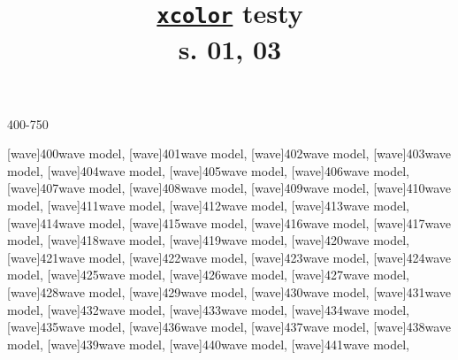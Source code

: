 \documentclass[a4paper,11pt]{article}
\title{\href{https://repo.skni.umcs.pl/ctan/macros/latex/contrib/xcolor/xcolor.pdf}{\texttt{xcolor}} testy \\
  s. 01, 03}
\author{}
\begin{document}





\maketitle %



400-750

\noindent
{}[wave]{400}{wave model},
[wave]{401}{wave model},
[wave]{402}{wave model},
[wave]{403}{wave model},
[wave]{404}{wave model},
[wave]{405}{wave model},
[wave]{406}{wave model}, \\
[wave]{407}{wave model},
[wave]{408}{wave model},
[wave]{409}{wave model},
[wave]{410}{wave model},
[wave]{411}{wave model},
[wave]{412}{wave model},
[wave]{413}{wave model}, \\
[wave]{414}{wave model},
[wave]{415}{wave model},
[wave]{416}{wave model},
[wave]{417}{wave model},
[wave]{418}{wave model},
[wave]{419}{wave model},
[wave]{420}{wave model}, \\
[wave]{421}{wave model},
[wave]{422}{wave model},
[wave]{423}{wave model},
[wave]{424}{wave model},
[wave]{425}{wave model},
[wave]{426}{wave model},
[wave]{427}{wave model}, \\
[wave]{428}{wave model},
[wave]{429}{wave model},
[wave]{430}{wave model},
[wave]{431}{wave model},
[wave]{432}{wave model},
[wave]{433}{wave model},
[wave]{434}{wave model}, \\
[wave]{435}{wave model},
[wave]{436}{wave model},
[wave]{437}{wave model},
[wave]{438}{wave model},
[wave]{439}{wave model},
[wave]{440}{wave model},
[wave]{441}{wave model}, \\
\end{document}
